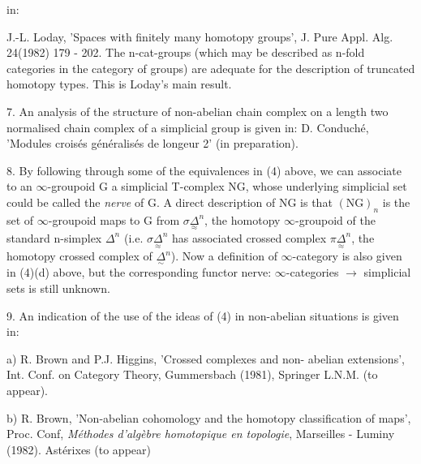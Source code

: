 
in:

J.-L. Loday, 'Spaces with finitely many homotopy groups', J. Pure
Appl. Alg.  24(1982) 179 - 202.
The n-cat-groups (which may be described as n-fold categories in
the category of groups) are adequate for the description of
truncated homotopy types.  This is Loday's main result.

7. An analysis of the structure of non-abelian chain complex on a
length two normalised chain complex of a simplicial group is
given in:
D. Conduché, 'Modules croisés généralisés de longeur 2' (in
preparation).

8. By following through some of the equivalences in (4) above, we
can associate to an $\infty$-groupoid G \quad a simplicial T-complex NG, whose
underlying simplicial set could be called the \textit{nerve} of G.  A
direct description of NG is that $(\mathrm{NG})_{n}$ is the set of
$\infty$-groupoid maps  to G from $\sigma\underset{\approx}{\Delta}^{n}$, the homotopy $\infty$-groupoid of the
standard n-simplex $\Delta^{n}$ (i.e. $\sigma\underset{\approx}{\Delta}^{n}$ has associated crossed complex $\pi\underset{\approx}{\Delta}^{n}$,
the homotopy crossed complex of $\underset{\sim}{\Delta}^{n}$).
Now a definition of $\infty$-category is also given in (4)(d) above,
but the corresponding functor nerve: $\infty$-categories $\longrightarrow$ simplicial
sets is still  unknown.

9. An indication of the use of the ideas of (4) in non-abelian
situations is given in:

a) R. Brown and P.J. Higgins, 'Crossed complexes and non-%
abelian extensions', Int. Conf. on Category Theory, Gummersbach
(1981),  Springer L.N.M. (to appear).

b) R. Brown, 'Non-abelian cohomology and the homotopy classification
of maps', Proc. Conf, \textit{Méthodes d'algèbre homotopique en topologie},
Marseilles - Luminy (1982).  Astérixes (to appear)

